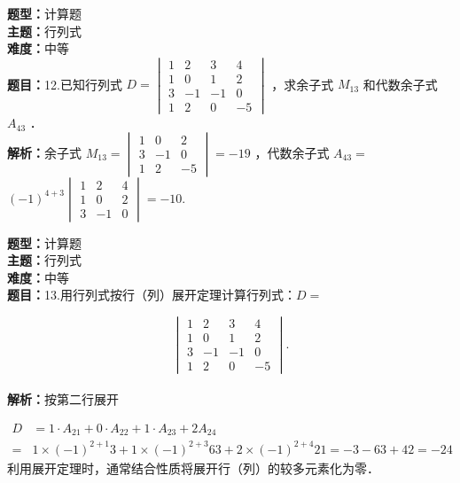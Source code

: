 \documentclass{ctexart}
\newenvironment{question}[5]{%
	\noindent\textbf{题型：}#1\\
	\textbf{主题：}#2\\
	\textbf{难度：}#3\\
	\textbf{题目：}#4\\
	\textbf{解析：}#5\\
	\vspace{1em}
}{}
\begin{document}
	\begin{question}
		{计算题}
		{行列式}
		{中等}
		{12.已知行列式 \(D=\begin{vmatrix}1 & 2 & 3 & 4 \\ 1 & 0 & 1 & 2 \\ 3 & -1 & -1 & 0 \\ 1 & 2 & 0 & -5\end{vmatrix}\) ，求余子式 \(M_{13}\) 和代数余子式 \(A_{43}\) ．}
		{余子式 \(M_{13}=\begin{vmatrix}1 & 0 & 2 \\ 3 & -1 & 0 \\ 1 & 2 & -5\end{vmatrix}=-19\) ，代数余子式 \(A_{43}=\) \((-1)^{4+3}\begin{vmatrix}1 & 2 & 4 \\ 1 & 0 & 2 \\ 3 & -1 & 0\end{vmatrix}=-10\).}
	\end{question}
	
	
	
	\begin{question}
		{计算题}
		{行列式}
		{中等}
		{13.用行列式按行（列）展开定理计算行列式：\(D=\)
			
			\[
			\begin{vmatrix}
				1 & 2 & 3 & 4 \\
				1 & 0 & 1 & 2 \\
				3 & -1 & -1 & 0 \\
				1 & 2 & 0 & -5
			\end{vmatrix} .
			\]}
		{按第二行展开
			
			\[
			\begin{aligned}
				D & =1 \cdot A_{21}+0 \cdot A_{22}+1 \cdot A_{23}+2 A_{24} \\
				= & 1 \times(-1)^{2+1} 3+1 \times(-1)^{2+3} 63+2 \times(-1)^{2+4} 21=-3-63+42=-24
			\end{aligned}
			\]
			利用展开定理时，通常结合性质将展开行（列）的较多元素化为零．}
	\end{question}
	
\end{document}
